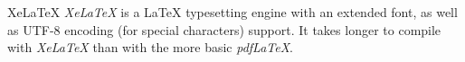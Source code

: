 \begin{definition}{XeLaTeX} \textit{XeLaTeX} is a LaTeX typesetting engine with an extended font, as well as UTF-8 encoding (for special characters) support. It takes longer to compile with \textit{XeLaTeX} than with the more basic \textit{pdfLaTeX}.\end{definition}



